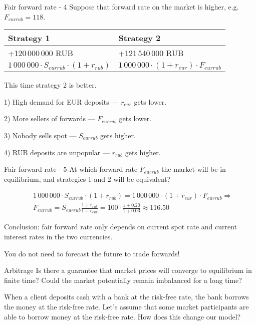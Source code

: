 \documentclass{beamer}
\begin{document}
\begin{frame}{Fair forward rate - 4}
\justify
Suppose that forward rate on the market is higher, e.g. $F_{eurrub}=118$.


\justify
\centering
\begin{tabular}{l|l}
Strategy 1 & Strategy 2 \\ \hline
+120\,000\,000 RUB  & +121\,540\,000 RUB \\
$1\,000\,000 \cdot S_{eurrub} \cdot (1+r_{rub})$ & $1\,000\,000 \cdot (1+r_{eur}) \cdot F_{eurrub}$
\end{tabular}

\justify
This time strategy 2 is better. 

1) High demand for EUR deposits --- $r_{eur}$ gets lower.

2) More sellers of forwards --- $F_{eurrub}$ gets lower.

3) Nobody sells spot --- $S_{eurrub}$ gets higher. 

4) RUB deposits are unpopular --- $r_{rub}$ gets higher.
\end{frame}



\begin{frame}{Fair forward rate - 5}
\justify
At which forward rate $F_{eurrub}$ the market will be in equilibrium, and strategies 1 and 2 will be equivalent?

\begin{align*}
&1\,000\,000 \cdot S_{eurrub} \cdot (1 + r_{rub}) = 1\,000\,000 \cdot (1+r_{eur}) \cdot F_{eurrub} \Rightarrow \\
&F_{eurrub} = S_{eurrub} \frac{1 + r_{rub}}{1 + r_{eur}} = 100 \cdot \frac{1 + 0.20}{1 + 0.03} \approx 116.50
\end{align*}

\justify
Conclusion: fair forward rate only depends on current spot rate and current interest rates in the two currencies.

\justify
You do not need to forecast the future to trade forwards!
\end{frame}



\begin{frame}{Arbitrage}
\justify
Is there a guarantee that market prices will converge to equilibrium in finite time? Could the market potentially remain imbalanced for a long time?

\justify
When a client deposits cash with a bank at the risk-free rate, the bank borrows the money at the risk-free rate. Let's assume that some market participants are able to borrow money at the risk-free rate. How does this change our model?
\end{frame}
\end{document}
